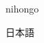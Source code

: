 \documentclass[a4paper]{jsarticle}
\begin{document}
\begin{jk}
nihongo      
\end{jk}
\begin{jk}
  日本語  
\end{jk}
\end{document}
